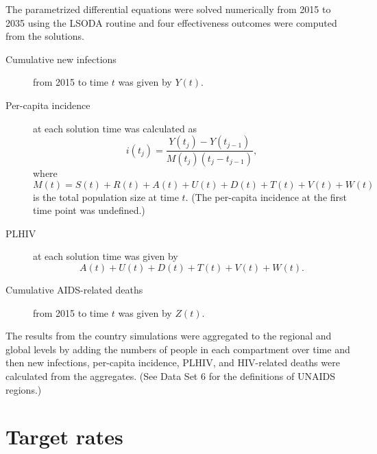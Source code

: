 \documentclass{article}
\begin{document}
The parametrized differential equations were solved numerically from
2015 to 2035 using the LSODA
routine \cite{odepack, scipy, medlock2016-git} and four effectiveness
outcomes were computed from the solutions.
\begin{description}
\item[Cumulative new infections] from 2015 to time $t$ was given by
  $Y(t)$.

\item[Per-capita incidence] at each solution time was calculated as
  \begin{equation}
    i(t_j) = \frac{Y(t_j) - Y(t_{j - 1})}{M(t_j) (t_j - t_{j - 1})},
  \end{equation}
  where
  \begin{equation}
    M(t) = S(t) + R(t) + A(t) + U(t) + D(t) + T(t) + V(t) + W(t)
  \end{equation}
  is the total population size at time $t$.  (The per-capita incidence
  at the first time point was undefined.)

\item[PLHIV] at each solution time was given by
  \begin{equation}
    A(t) + U(t) + D(t) + T(t) + V(t) + W(t).
  \end{equation}

\item[Cumulative AIDS-related deaths] from 2015 to time $t$ was given
  by $Z(t)$.

\end{description}

The results from the country simulations were aggregated to the
regional and global levels by adding the numbers of people in each
compartment over time and then new infections, per-capita incidence,
PLHIV, and HIV-related deaths were calculated from the aggregates.
(See Data Set 6 for the definitions of UNAIDS regions.)


\section{Target rates}
\label{targets}
\end{document}

